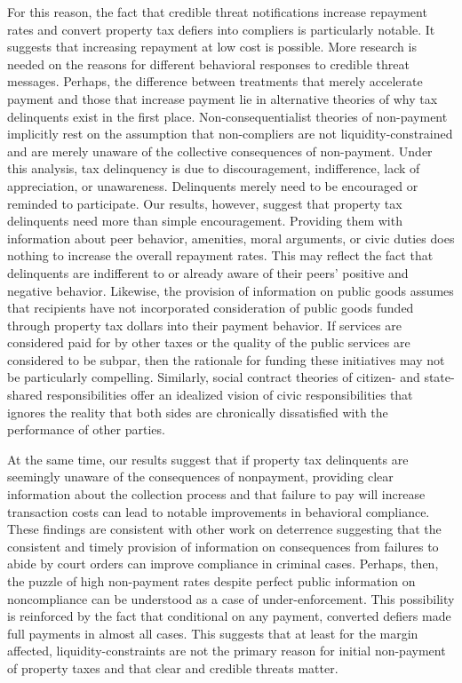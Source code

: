 \documentclass[12pt,titlepage]{article}
\begin{document}
For this reason, the fact that credible threat notifications increase 
repayment rates and convert property tax defiers into compliers is particularly notable. 
It suggests that increasing repayment at low cost is possible. More research is 
needed on the reasons for different behavioral responses to credible threat messages. Perhaps, the difference 
between treatments that merely accelerate payment and those that increase 
payment lie in alternative theories of why tax delinquents exist in the 
first place. Non-consequentialist theories of non-payment implicitly rest 
on the assumption that non-compliers are not liquidity-constrained and are
merely unaware of the collective consequences of non-payment. Under this 
analysis, tax delinquency is due to discouragement, indifference, 
lack of appreciation, or unawareness. Delinquents merely need to be 
encouraged or reminded to participate. Our results, however, suggest 
that property tax delinquents need more than simple encouragement. Providing them with 
information about peer behavior, amenities, moral arguments, or civic 
duties does nothing to increase the overall repayment rates. This may 
reflect the fact that delinquents are indifferent to or already aware 
of their peers' positive and negative behavior. Likewise, the provision 
of information on public goods assumes that recipients have not 
incorporated consideration of public goods funded through property tax dollars 
into their payment behavior. If services are considered paid for by 
other taxes or the quality of the public services are considered to be 
subpar, then the rationale for funding these initiatives may not be 
particularly compelling.  Similarly, social contract theories of citizen- 
and state-shared responsibilities offer an idealized vision of civic 
responsibilities that ignores the reality that both sides are chronically 
dissatisfied with the performance of other parties.

At the same time, our results suggest that if property tax delinquents are 
seemingly unaware of the consequences of nonpayment, providing clear information 
about the collection process and that failure to pay will increase transaction costs 
can lead to notable improvements in behavioral compliance. These findings are consistent
with other work on deterrence suggesting that the consistent and timely provision of information on consequences 
from failures to abide by court orders can improve compliance in criminal cases\citep{hawken}. 
Perhaps, then, the puzzle of high non-payment 
rates despite perfect public information on noncompliance can be understood 
as a case of under-enforcement. This possibility is reinforced by the fact 
that conditional on any payment, converted defiers made full payments in almost all cases. 
This suggests that at least for the margin affected, liquidity-constraints are not the primary 
reason for initial non-payment of property taxes and that clear and credible threats matter.

\newpage


\end{document}
